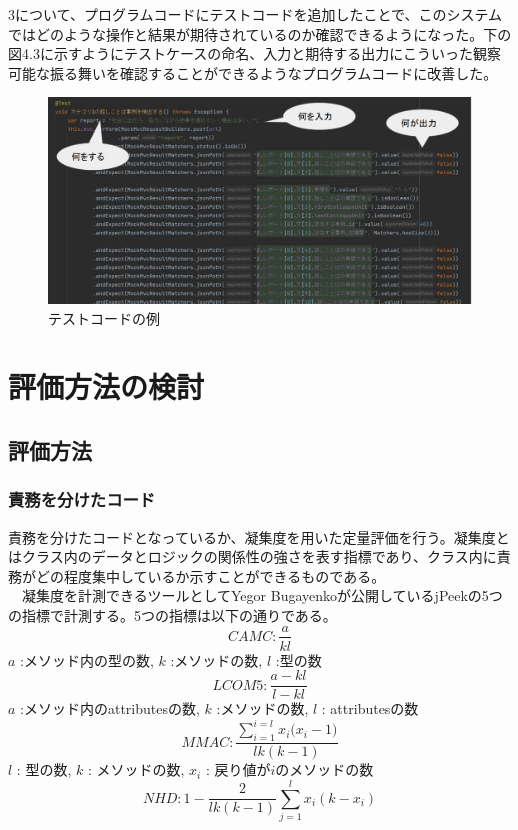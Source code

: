 \documentclass[12pt, a4paper]{jreport}
\begin{document}
3について、プログラムコードにテストコードを追加したことで、このシステムではどのような操作と結果が期待されているのか確認できるようになった。下の図4.3に示すようにテストケースの命名、入力と期待する出力にこういった観察可能な振る舞いを確認することができるようなプログラムコードに改善した。
\begin{figure}[H]
\centering
\includegraphics[width=1\linewidth]{image/kaizen3.png}
\caption{テストコードの例}
\label{fig:enter-label}
\end{figure}
\chapter{評価方法の検討}
\section{評価方法}
\subsection{責務を分けたコード}
責務を分けたコードとなっているか、凝集度を用いた定量評価を行う。凝集度とはクラス内のデータとロジックの関係性の強さを表す指標であり、クラス内に責務がどの程度集中しているか示すことができるものである。
\\　凝集度を計測できるツールとしてYegor Bugayenkoが公開しているjPeekの5つの指標で計測する。5つの指標は以下の通りである。
\\
\begin{equation}
CAMC:
\frac{a}{kl}
\end{equation}
$a$ :メソッド内の型の数, $k$ :メソッドの数, $l$ :型の数
\begin{equation}
LCOM5:
\frac{a-kl}{l-kl}
\end{equation}
$a$ :メソッド内のattributesの数, $k$ :メソッドの数, $l$ : attributesの数
\begin{equation}
MMAC:
\frac{\sum^{i=l}_{i=1}{{x}_{i}{({x}_{i}-1})}}{lk(k-1)}
\end{equation}
$l$ : 型の数, $k$ : メソッドの数, ${x}_{i}$ : 戻り値が${i}$のメソッドの数
\begin{equation}
NHD:
1-\frac{2}{lk(k-1)}\sum^{l}_{j=1}{x}_{i}{(k-{x}_{i})}
\end{equation}
\end{document}
